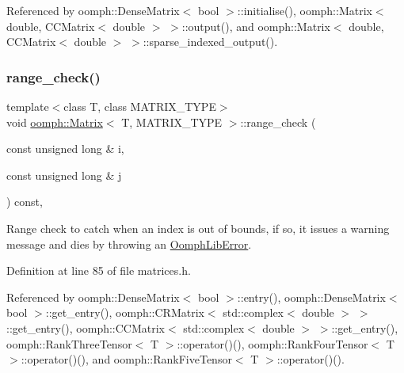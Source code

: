 Referenced by oomph\+::\+Dense\+Matrix$<$ bool $>$\+::initialise(), oomph\+::\+Matrix$<$ double, C\+C\+Matrix$<$ double $>$ $>$\+::output(), and oomph\+::\+Matrix$<$ double, C\+C\+Matrix$<$ double $>$ $>$\+::sparse\+\_\+indexed\+\_\+output().

\mbox{\label{classoomph_1_1Matrix_a2fed2ea1840638eb0ddaa2d4ab1da82f}} 
\subsubsection{\texorpdfstring{range\+\_\+check()}{range\_check()}}
{\footnotesize\ttfamily template$<$class T, class M\+A\+T\+R\+I\+X\+\_\+\+T\+Y\+PE$>$ \\
void \hyperlink{classoomph_1_1Matrix}{oomph\+::\+Matrix}$<$ T, M\+A\+T\+R\+I\+X\+\_\+\+T\+Y\+PE $>$\+::range\+\_\+check (\begin{DoxyParamCaption}\item[{const unsigned long \&}]{i,  }\item[{const unsigned long \&}]{j }\end{DoxyParamCaption}) const\hspace{0.3cm}{\ttfamily [inline]}, {\ttfamily [protected]}}



Range check to catch when an index is out of bounds, if so, it issues a warning message and dies by throwing an {\ttfamily \hyperlink{classoomph_1_1OomphLibError}{Oomph\+Lib\+Error}}. 



Definition at line 85 of file matrices.\+h.



Referenced by oomph\+::\+Dense\+Matrix$<$ bool $>$\+::entry(), oomph\+::\+Dense\+Matrix$<$ bool $>$\+::get\+\_\+entry(), oomph\+::\+C\+R\+Matrix$<$ std\+::complex$<$ double $>$ $>$\+::get\+\_\+entry(), oomph\+::\+C\+C\+Matrix$<$ std\+::complex$<$ double $>$ $>$\+::get\+\_\+entry(), oomph\+::\+Rank\+Three\+Tensor$<$ T $>$\+::operator()(), oomph\+::\+Rank\+Four\+Tensor$<$ T $>$\+::operator()(), and oomph\+::\+Rank\+Five\+Tensor$<$ T $>$\+::operator()().

\mbox{\label{classoomph_1_1Matrix_a4f97fa3c94e6fd664e46acb8873a80f8}} 
